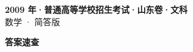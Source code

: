 \documentclass[zihao=-4, a4paper]{ctexart}
\begin{document}
\begin{center}
  {\Large\bfseries 2009 年·普通高等学校招生考试·山东卷·文科}\\[4pt]
  {\large 数学 · 简答版}
\end{center}
\medskip
{}

\clearpage
{}
\begin{center}{\Large\bfseries 答案速查}\end{center}
\medskip

\end{document}

